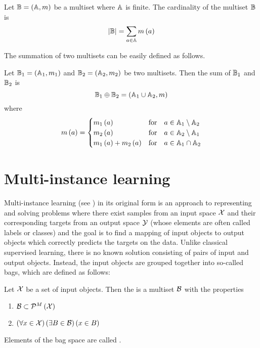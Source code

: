 \begin{define}
	Let \( \mathbb{B} = \left( \mathbb{A}, m \right) \) be a multiset where \( \mathbb{A} \) is finite. The cardinality of the multiset \( \mathbb{B} \) is
	\[ \left\lvert \mathbb{B} \right\rvert = \sum_{a \in \mathbb{A}} m \left( a \right) \]
\end{define}

The summation of two multisets can be easily defined as follows.

\begin{define}\label{def:multiset-sum}
	Let \( \mathbb{B}_1 = \left( \mathbb{A}_1, m_1 \right) \) and \( \mathbb{B}_2 = \left( \mathbb{A}_2, m_2 \right) \) be two multisets. Then the sum of \( \mathbb{B}_1 \) and \( \mathbb{B}_2 \) is
	\[ \mathbb{B}_1 \oplus \mathbb{B}_2 = \left( \mathbb{A}_1 \cup \mathbb{A}_2, m \right) \]
	where
	\[ m \left( a \right) = \begin{cases}
			m_1 \left( a \right) &\text{for} \quad a \in \mathbb{A}_1 \setminus \mathbb{A}_2 \\
			m_2 \left( a \right) &\text{for} \quad a \in \mathbb{A}_2 \setminus \mathbb{A}_1 \\
			m_1 \left( a \right) + m_2 \left( a \right) &\text{for} \quad a \in \mathbb{A}_1 \cap \mathbb{A}_2 \\
		\end{cases} \]
\end{define}

\section{Multi-instance learning}
Multi-instance learning (see \cite{dietterich_solving_1997}) in its original form is an approach to representing and solving problems where there exist samples from an input space \( \mathcal{X} \) and their corresponding targets from an output space \( \mathcal{Y} \) (whose elements are often called labels or classes) and the goal is to find a mapping of input objects to output objects which correctly predicts the targets on the data. Unlike classical supervised learning, there is no known solution consisting of pairs of input and output objects. Instead, the input objects are grouped together into so-called bags, which are defined as follows:

\begin{define}
	Let \( \mathcal{X} \) be a set of input objects. Then the  is a multiset \( \mathcal{B} \) with the properties
	\begin{enumerate}
		\item \( \mathcal{B} \subset \mathcal{P}^M \left( \mathcal{X} \right) \)
		\item \( \left( \forall x \in \mathcal{X} \right) \left( \exists B \in \mathcal{B} \right) \left( x \in B \right) \)
	\end{enumerate}
	Elements of the bag space are called .
\end{define}

